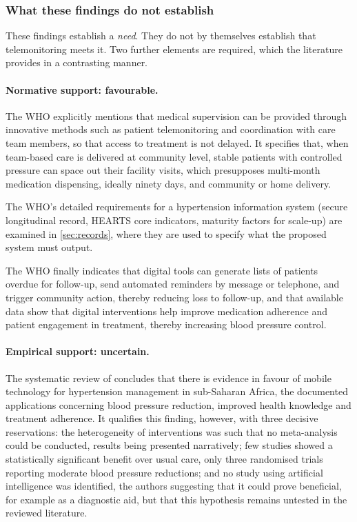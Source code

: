 \documentclass[12pt,a4paper,oneside]{report}
\begin{document}
\subsubsection{What these findings do not establish}

These findings establish a \emph{need}. They do not by themselves establish that telemonitoring meets it. Two further elements are required, which the literature provides in a contrasting manner.

\paragraph{Normative support: favourable.} The WHO \parencite{who2023hypertension} explicitly mentions that medical supervision can be provided through innovative methods such as patient telemonitoring and coordination with care team members, so that access to treatment is not delayed. It specifies that, when team-based care is delivered at community level, stable patients with controlled pressure can space out their facility visits, which presupposes multi-month medication dispensing, ideally ninety days, and community or home delivery.

The WHO's detailed requirements for a hypertension information system (secure longitudinal record, HEARTS core indicators, maturity factors for scale-up) are examined in \cref{sec:records}, where they are used to specify what the proposed system must output.

The WHO finally indicates that digital tools can generate lists of patients overdue for follow-up, send automated reminders by message or telephone, and trigger community action, thereby reducing loss to follow-up, and that available data show that digital interventions help improve medication adherence and patient engagement in treatment, thereby increasing blood pressure control.

\paragraph{Empirical support: uncertain.} The systematic review of \textcite{stokes2022} concludes that there is evidence in favour of mobile technology for hypertension management in sub-Saharan Africa, the documented applications concerning blood pressure reduction, improved health knowledge and treatment adherence. It qualifies this finding, however, with three decisive reservations: the heterogeneity of interventions was such that no meta-analysis could be conducted, results being presented narratively; few studies showed a statistically significant benefit over usual care, only three randomised trials reporting moderate blood pressure reductions; and no study using artificial intelligence was identified, the authors suggesting that it could prove beneficial, for example as a diagnostic aid, but that this hypothesis remains untested in the reviewed literature.
\end{document}
